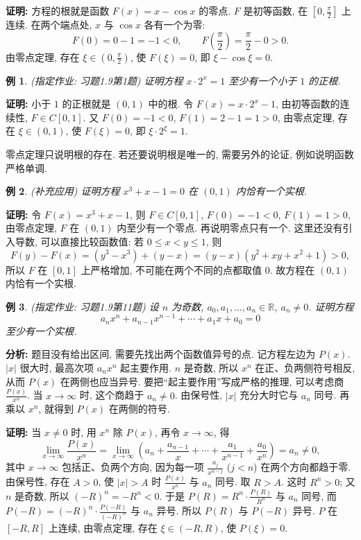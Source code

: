 \documentclass[UTF8,openany]{ctexbook}
\theoremstyle{chinesetextbook}
\newtheorem{example}{例}[section]
\newenvironment{cnproof}{\par\indent\textbf{证明:} \ignorespaces}{\par}
\begin{document}
\begin{cnproof}
方程的根就是函数 $F(x)=x-\cos x$ 的零点. $F$ 是初等函数, 在 $\displaystyle\left[0,\frac\pi2\right]$ 上连续. 在两个端点处, $x$ 与 $\cos x$ 各有一个为零:
\[
F(0)=0-1=-1<0,\qquad F\!\left(\frac\pi2\right)=\frac\pi2-0>0.
\]
由零点定理, 存在 $\displaystyle\xi\in\left(0,\frac\pi2\right)$, 使 $F(\xi)=0$, 即 $\xi-\cos\xi=0$.
\end{cnproof}
\begin{example}
\textnormal{(指定作业: 习题1.9第1题)} 证明方程 $x\cdot2^x=1$ 至少有一个小于 $1$ 的正根.
\end{example}
\begin{cnproof}
小于 $1$ 的正根就是 $(0,1)$ 中的根. 令 $F(x)=x\cdot2^x-1$, 由初等函数的连续性, $F\in C[0,1]$. 又 $F(0)=-1<0$, $F(1)=2-1=1>0$, 由零点定理, 存在 $\xi\in(0,1)$, 使 $F(\xi)=0$, 即 $\xi\cdot2^\xi=1$.
\end{cnproof}
零点定理只说明根的存在. 若还要说明根是唯一的, 需要另外的论证, 例如说明函数严格单调.
\begin{example}
\textnormal{(补充应用)} 证明方程 $x^3+x-1=0$ 在 $(0,1)$ 内恰有一个实根.
\end{example}
\begin{cnproof}
令 $F(x)=x^3+x-1$, 则 $F\in C[0,1]$, $F(0)=-1<0$, $F(1)=1>0$, 由零点定理, $F$ 在 $(0,1)$ 内至少有一个零点. 再说明零点只有一个. 这里还没有引入导数, 可以直接比较函数值: 若 $0\le x<y\le1$, 则
\[
F(y)-F(x)=(y^3-x^3)+(y-x)=(y-x)(y^2+xy+x^2+1)>0,
\]
所以 $F$ 在 $[0,1]$ 上严格增加, 不可能在两个不同的点都取值 $0$. 故方程在 $(0,1)$ 内恰有一个实根.
\end{cnproof}
\begin{example}
\textnormal{(指定作业: 习题1.9第11题)} 设 $n$ 为奇数, $a_0,a_1,\ldots,a_n\in\mathbb R$, $a_n\ne0$. 证明方程
\[
a_nx^n+a_{n-1}x^{n-1}+\cdots+a_1x+a_0=0
\]
至少有一个实根.
\end{example}
\par\indent\textbf{分析:} 题目没有给出区间, 需要先找出两个函数值异号的点. 记方程左边为 $P(x)$. $|x|$ 很大时, 最高次项 $a_nx^n$ 起主要作用. $n$ 是奇数, 所以 $x^n$ 在正、负两侧符号相反, 从而 $P(x)$ 在两侧也应当异号. 要把“起主要作用”写成严格的推理, 可以考虑商 $\displaystyle\frac{P(x)}{x^n}$. 当 $x\to\infty$ 时, 这个商趋于 $a_n\ne0$. 由保号性, $|x|$ 充分大时它与 $a_n$ 同号. 再乘以 $x^n$, 就得到 $P(x)$ 在两侧的符号.
\begin{cnproof}
当 $x\ne0$ 时, 用 $x^n$ 除 $P(x)$, 再令 $x\to\infty$, 得
\[
\lim_{x\to\infty}\frac{P(x)}{x^n}=\lim_{x\to\infty}\left(a_n+\frac{a_{n-1}}x+\cdots+\frac{a_1}{x^{n-1}}+\frac{a_0}{x^n}\right)=a_n\ne0,
\]
其中 $x\to\infty$ 包括正、负两个方向, 因为每一项 $\displaystyle\frac{a_j}{x^{n-j}}$ ($j<n$) 在两个方向都趋于零. 由保号性, 存在 $A>0$, 使 $|x|>A$ 时 $\displaystyle\frac{P(x)}{x^n}$ 与 $a_n$ 同号. 取 $R>A$. 这时 $R^n>0$; 又 $n$ 是奇数, 所以 $(-R)^n=-R^n<0$. 于是 $\displaystyle P(R)=R^n\cdot\frac{P(R)}{R^n}$ 与 $a_n$ 同号, 而 $\displaystyle P(-R)=(-R)^n\cdot\frac{P(-R)}{(-R)^n}$ 与 $a_n$ 异号. 所以 $P(R)$ 与 $P(-R)$ 异号. $P$ 在 $[-R,R]$ 上连续, 由零点定理, 存在 $\xi\in(-R,R)$, 使 $P(\xi)=0$.
\end{cnproof}
\end{document}
